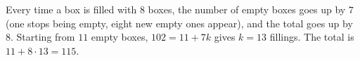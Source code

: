 Every time a box is filled with $8$ boxes, the number of empty boxes goes up by $7$ (one stops being empty, eight new empty ones appear), and the total goes up by $8$. Starting from $11$ empty boxes, $102=11+7k$ gives $k=13$ fillings. The total is $11+8\cdot13=\boxed{115}$.
